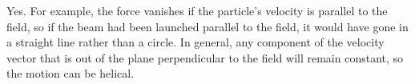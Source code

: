 Yes. For example, the force vanishes if the particle's
velocity is parallel to the field, so if the beam had been
launched parallel to the field, it would have gone in a
straight line rather than a circle. In general, any
component of the velocity vector that is out of the plane
perpendicular to the field will remain constant, so the
motion can be helical.



